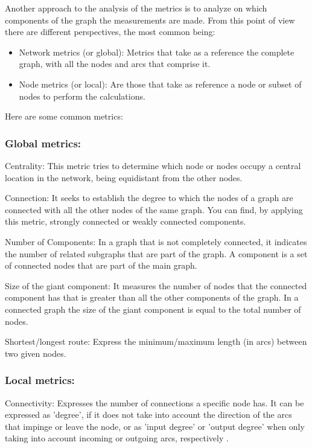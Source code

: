 	Another approach to the analysis of the metrics is to analyze on which components of the graph the measurements are made. From this point of view there are different perspectives, the most common being:

	\begin{itemize}
		\item Network metrics (or global): Metrics that take as a reference the complete graph, with all the nodes and arcs that comprise it.
		\item Node metrics (or local): Are those that take as reference a node or subset of nodes to perform the calculations.
	\end{itemize}

	Here are some common metrics:
	
	\subsubsection{Global metrics:}
	
	Centrality: This metric tries to determine which node or nodes occupy a central location in the network, being equidistant from the other nodes.
	
	Connection: It seeks to establish the degree to which the nodes of a graph are connected with all the other nodes of the same graph. You can find, by applying this metric, strongly connected or weakly connected components.
	
	Number of Components: In a graph that is not completely connected, it indicates the number of related subgraphs that are part of the graph. A component is a set of connected nodes that are part of the main graph.
	
	Size of the giant component: It measures the number of nodes that the connected component has that is greater than all the other components of the graph. In a connected graph the size of the giant component is equal to the total number of nodes.
	
	Shortest/longest route: Express the minimum/maximum length (in arcs) between two given nodes.
	
	\subsubsection {Local metrics:}
	
	Connectivity: Expresses the number of connections a specific node has. It can be expressed as 'degree', if it does not take into account the direction of the arcs that impinge or leave the node, or as 'input degree' or 'output degree' when only taking into account incoming or outgoing arcs, respectively .
	
